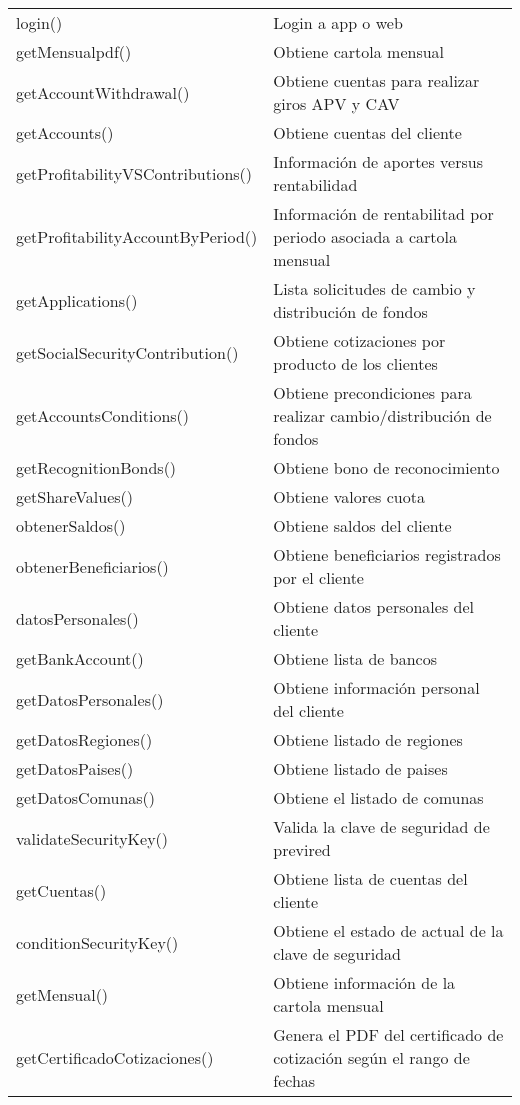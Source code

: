 \begin{longtable}{|p{7cm}|p{8.5cm}|}
    \hline
    \endlastfoot
    login() & Login a app o web \\
    getMensualpdf() &	Obtiene cartola mensual \\
    getAccountWithdrawal() &	Obtiene cuentas para realizar giros APV y CAV \\
    getAccounts() &	Obtiene cuentas del cliente \\
    getProfitabilityVSContributions() &	Información de aportes versus rentabilidad \\
    getProfitabilityAccountByPeriod() &	Información de rentabilitad por periodo asociada a cartola mensual \\
    getApplications() &	Lista solicitudes de cambio y distribución de fondos \\
    getSocialSecurityContribution() &	Obtiene cotizaciones por producto de los clientes \\
    getAccountsConditions() &	Obtiene precondiciones para realizar cambio/distribución de fondos \\
    getRecognitionBonds() &	Obtiene bono de reconocimiento \\
    getShareValues() &	Obtiene valores cuota \\
    obtenerSaldos() &	Obtiene saldos del cliente \\
    obtenerBeneficiarios() &	Obtiene beneficiarios registrados por el cliente \\
    datosPersonales() &	Obtiene datos personales del cliente \\
    getBankAccount() &	Obtiene lista de bancos \\
    getDatosPersonales() &	Obtiene información personal del cliente \\
    getDatosRegiones() &	Obtiene listado de regiones \\
    getDatosPaises() &	Obtiene listado de paises \\
    getDatosComunas() &	Obtiene el listado de comunas \\
    validateSecurityKey() &	Valida la clave de seguridad de previred \\
    getCuentas() &	Obtiene lista de cuentas del cliente \\
    conditionSecurityKey() &	Obtiene el estado de actual de la clave de seguridad \\
    getMensual() &	Obtiene información de la cartola mensual \\
    getCertificadoCotizaciones() &	Genera el PDF del certificado de cotización según el rango de fechas \\

\end{longtable}
